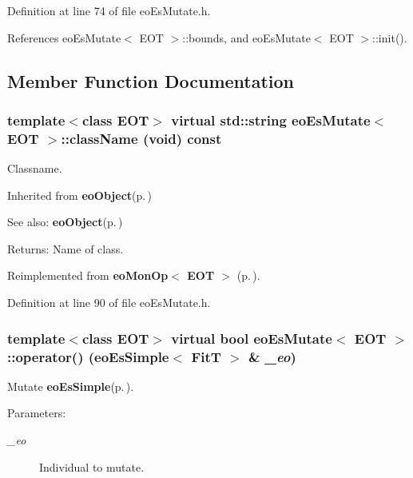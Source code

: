 Definition at line 74 of file eo\-Es\-Mutate.h.

References eo\-Es\-Mutate$<$ EOT $>$::bounds, and eo\-Es\-Mutate$<$ EOT $>$::init().

\subsection{Member Function Documentation}
\subsubsection{\setlength{\rightskip}{0pt plus 5cm}template$<$class EOT$>$ virtual std::string {\bf eo\-Es\-Mutate}$<$ {\bf EOT} $>$::class\-Name (void) const\hspace{0.3cm}{\tt  [inline, virtual]}}\label{classeo_es_mutate_a2}


Classname. 

Inherited from {\bf eo\-Object}{\rm (p.\,\pageref{classeo_object})} \begin{Desc}
\item[See also:]{\bf eo\-Object}{\rm (p.\,\pageref{classeo_object})}\end{Desc}
\begin{Desc}
\item[Returns:]Name of class. \end{Desc}


Reimplemented from {\bf eo\-Mon\-Op$<$ EOT $>$} {\rm (p.\,\pageref{classeo_mon_op})}.

Definition at line 90 of file eo\-Es\-Mutate.h.
\subsubsection{\setlength{\rightskip}{0pt plus 5cm}template$<$class EOT$>$ virtual bool {\bf eo\-Es\-Mutate}$<$ {\bf EOT} $>$::operator() ({\bf eo\-Es\-Simple}$<$ {\bf Fit\-T} $>$ \& {\em \_\-eo})\hspace{0.3cm}{\tt  [inline, virtual]}}\label{classeo_es_mutate_a3}


Mutate {\bf eo\-Es\-Simple}{\rm (p.\,\pageref{classeo_es_simple})}. 

\begin{Desc}
\item[Parameters:]
\begin{description}
\item[{\em \_\-eo}]Individual to mutate. \end{description}
\end{Desc}


